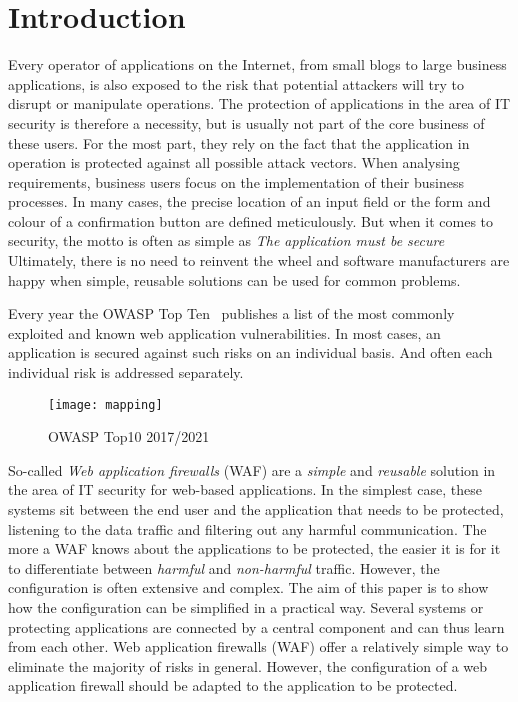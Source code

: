 \chapter{Introduction}


Every operator of applications on the Internet, from small blogs to large business applications, is also exposed to the risk that potential attackers will try to disrupt or manipulate operations. The protection of applications in the area of IT security is therefore a necessity, but is usually not part of the core business of these users. For the most part, they rely on the fact that the application in operation is protected against all possible attack vectors. When analysing requirements, business users focus on the implementation of their business processes. In many cases, the precise location of an input field or the form and colour of a confirmation button are defined meticulously. But when it comes to security, the motto is often as simple as \glqq\emph{The application must be secure}\grqq \\

Ultimately, there is no need to reinvent the wheel and software manufacturers are happy when simple, reusable solutions can be used for common problems.

Every year the OWASP Top Ten~\cite{owasp10} publishes a list of the most commonly exploited and known web application vulnerabilities. In most cases, an application is secured against such risks on an individual basis.
And often each individual risk is addressed separately.\\


\begin{figure}[h]
  \begin{center}
    \texttt{[image: mapping]}
    \caption{OWASP Top10 2017/2021~\cite{owasp10}}
    \label{fig.topten}
  \end{center}
\end{figure}

So-called \emph{Web application firewalls} (WAF) are a \emph{simple} and \emph{reusable} solution in the area of IT security for web-based applications. In the simplest case, these systems sit between the end user and the application that needs to be protected, listening to the data traffic and filtering out any harmful communication. The more a WAF knows about the applications to be protected, the easier it is for it to differentiate between \emph{harmful} and \emph{non-harmful} traffic. However, the configuration is often extensive and complex. The aim of this paper is to show how the configuration can be simplified in a practical way. Several systems or protecting applications are connected by a central component and can thus learn from each other. Web application firewalls (WAF) offer a relatively simple way to eliminate the majority of risks in general. However, the configuration of a web application firewall should be adapted to the application to be protected. \\

